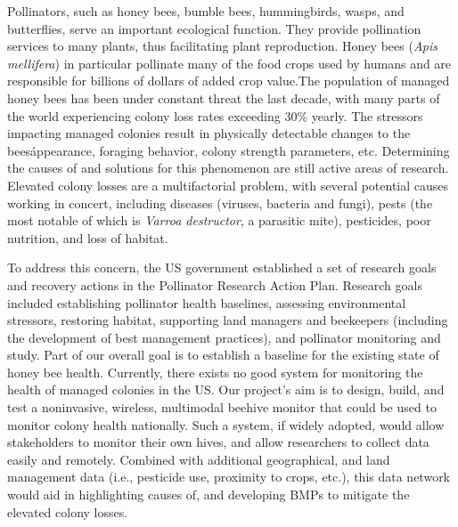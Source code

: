 


Pollinators, such as honey bees, bumble bees, hummingbirds, wasps, and butterflies, serve an important ecological function. They provide pollination services to many plants, thus facilitating plant reproduction. Honey bees (\textit{Apis mellifera}) in particular pollinate many of the food crops used by humans and are responsible for billions of dollars of added crop value.The population of managed honey bees has been under constant threat the last decade, with many parts of the world experiencing colony loss rates exceeding 30\% yearly. The stressors impacting managed colonies result in physically detectable changes to the bees\' appearance, foraging behavior, colony strength parameters, etc. Determining the causes of and solutions for this phenomenon are still active areas of research. Elevated colony losses are a multifactorial problem, with several potential causes working in concert, including diseases (viruses, bacteria and fungi), pests (the most notable of which is \textit{Varroa destructor}, a parasitic mite), pesticides, poor nutrition, and loss of habitat.

To address this concern, the US government established a set of research goals and recovery actions in the Pollinator Research Action Plan. Research goals included establishing pollinator health baselines, assessing environmental stressors, restoring habitat, supporting land managers and beekeepers (including the development of best management practices), and pollinator monitoring and study. Part of our overall goal is to establish a baseline for the existing state of honey bee health. Currently, there exists no good system for monitoring the health of managed colonies in the US. Our project’s aim is to design, build, and test a noninvasive, wireless, multimodal beehive monitor that could be used to monitor colony health nationally. Such a system, if widely adopted, would allow stakeholders to monitor their own hives, and allow researchers to collect data easily and remotely. Combined with additional geographical, and land management data (i.e., pesticide use, proximity to crops, etc.), this data network would aid in highlighting causes of, and developing BMPs to mitigate the elevated colony losses.

